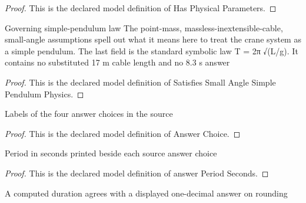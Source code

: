 \begin{proof}
  This is the declared model definition of Has Physical Parameters.
\end{proof}
\begin{definition}
  \label{def:physics:phyx-mini-0284:phyxminiproblems-problemphyxmini0284-satisfiessmallanglesimplependulumphysics}
  Governing simple-pendulum law The point-mass, massless-inextensible-cable, small-angle assumptions spell out what it means here to treat the crane system as a simple pendulum. The last field is the standard symbolic law T = 2π √(L/g). It contains no substituted 17 m cable length and no 8.3 s answer
\end{definition}
\begin{proof}
  This is the declared model definition of Satisfies Small Angle Simple Pendulum Physics.
\end{proof}
\begin{definition}
  \label{def:physics:phyx-mini-0284:phyxminiproblems-problemphyxmini0284-answerchoice}
  Labels of the four answer choices in the source
\end{definition}
\begin{proof}
  This is the declared model definition of Answer Choice.
\end{proof}
\begin{definition}
  \label{def:physics:phyx-mini-0284:phyxminiproblems-problemphyxmini0284-answerperiodseconds}
  Period in seconds printed beside each source answer choice
\end{definition}
\begin{proof}
  This is the declared model definition of answer Period Seconds.
\end{proof}
\begin{definition}
  \label{def:physics:phyx-mini-0284:phyxminiproblems-problemphyxmini0284-roundstodisplayedtenth}
  A computed duration agrees with a displayed one-decimal answer on rounding
\end{definition}
